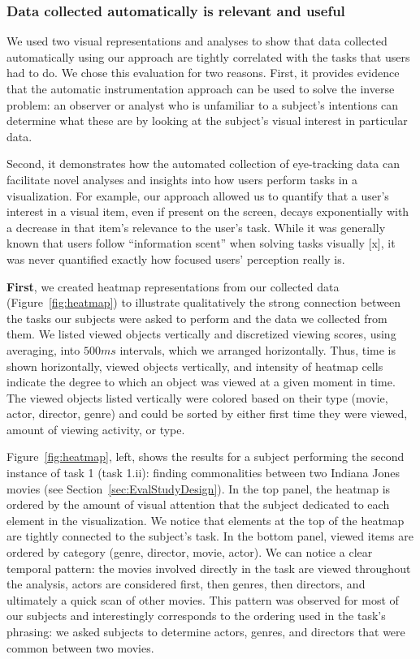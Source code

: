 \subsubsection{Data collected automatically is relevant and useful}
\label{sec:EvalDataCollected}
We used two visual representations and analyses to show that data collected automatically using our approach are tightly correlated with the tasks that users had to do. We chose this evaluation for two reasons. First, it provides evidence that the automatic instrumentation approach can be used to solve the inverse problem: an observer or analyst who is unfamiliar to a subject's intentions can determine what these are by looking at the subject's visual interest in particular data. 

Second, it demonstrates how the automated collection of eye-tracking data can facilitate novel analyses and insights into how users perform tasks in a visualization. For example, our approach allowed us to quantify that a user's interest in a visual item, even if present on the screen, decays exponentially with a decrease in that item's relevance to the user's task. While it was generally known that users follow ``information scent'' when solving tasks visually [x], it was never quantified exactly how focused users' perception really is.

\textbf{First}, we created heatmap representations from our collected data (Figure~\ref{fig:heatmap}) to illustrate qualitatively the strong connection between the tasks our subjects were asked to perform and the data we collected from them. We listed viewed objects vertically and discretized viewing scores, using averaging, into $500ms$ intervals, which we arranged horizontally. Thus, time is shown horizontally, viewed objects vertically, and intensity of heatmap cells indicate the degree to which an object was viewed at a given moment in time. The viewed objects listed vertically were colored based on their type (movie, actor, director, genre) and could be sorted by either first time they were viewed, amount of viewing activity, or type.

Figure~\ref{fig:heatmap}, left, shows the results for a subject performing the second instance of task 1 (task 1.ii): finding commonalities between two Indiana Jones movies (see Section~\ref{sec:EvalStudyDesign}). In the top panel, the heatmap is ordered by the amount of visual attention that the subject dedicated to each element in the visualization. We notice that elements at the top of the heatmap are tightly connected to the subject's  task.   In the bottom panel, viewed items are ordered by category (genre, director, movie, actor). We can notice a clear temporal pattern: the movies involved directly in the task are viewed throughout the analysis, actors are considered first, then genres, then directors, and ultimately a quick scan of other movies. This pattern was observed for most of our subjects and interestingly corresponds to the ordering used in the task's phrasing: we asked subjects to determine actors, genres, and directors that were common between two movies.  

